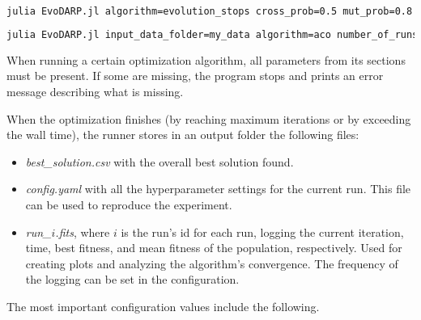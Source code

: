\begin{lstlisting}[language=bash, breaklines=true]
    julia EvoDARP.jl algorithm=evolution_stops cross_prob=0.5 mut_prob=0.8 num_generations=20000
\end{lstlisting}

\begin{lstlisting}[language=bash, breaklines=true]
    julia EvoDARP.jl input_data_folder=my_data algorithm=aco number_of_runs=10 num_ants=10 num_iterations=10000
\end{lstlisting}

When running a certain optimization algorithm, all parameters from its sections must be present. If some are missing, the program stops and prints an error message describing what is missing.

When the optimization finishes (by reaching maximum iterations or by exceeding the wall time), the runner stores in an output folder the following files:

\begin{itemize}
    \setlength\itemsep{0pt}
    \item \textit{best\_solution.csv} with the overall best solution found.
    \item \textit{config.yaml} with all the hyperparameter settings for the current run. This file can be used to reproduce the experiment.
    \item \textit{run\_$i$.fits}, where $i$ is the run's id for each run, logging the current iteration, time, best fitness, and mean fitness of the population, respectively. Used for creating plots and analyzing the algorithm's convergence. The frequency of the logging can be set in the configuration.
\end{itemize}

The most important configuration values include the following.

